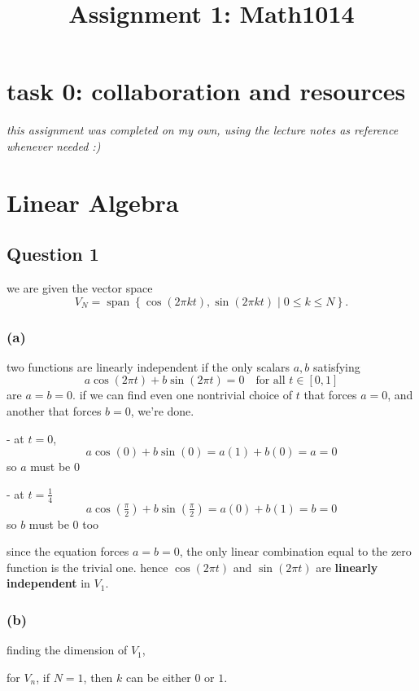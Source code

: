 \documentclass{article}
\author{}
\title{Assignment 1: Math1014}
\begin{document}
\setlength{\parindent}{0pt}
\maketitle

\section*{task 0: collaboration and resources}

\textit{this assignment was completed on my own, using the lecture notes as reference whenever needed :)}

\section{Linear Algebra}

\subsection{Question 1}
we are given the vector space
\[
V_N = \operatorname{span} \left\{\cos(2\pi kt),\sin(2\pi kt)\mid 0\leq k\leq N\right\}.
\]

\subsubsection*{(a)}
two functions are linearly independent if the only scalars $a,b$ satisfying
\[
a\cos(2\pi t) + b \sin(2\pi t) = 0 \quad \text{for all } t \in [0,1]
\]
are $a = b = 0$. if we can find even one nontrivial choice of $t$ that forces $a=0$, and another that forces $b=0$, we're done.

- at $t=0$,
\[
a\cos(0) + b\sin(0) = a(1) + b(0) = a = 0
\]
so $a$ must be $0$
 
- at $t = \frac{1}{4}$
\[
a\cos\left(\tfrac{\pi}{2}\right) + b\sin\left(\tfrac{\pi}{2}\right) = a(0) + b(1) = b = 0
\]
so $b$ must be $0$ too
 
since the equation forces $a=b=0$, the only linear combination equal to the zero function is the trivial one. 
hence $\cos(2\pi t)$ and $\sin(2\pi t)$ are \textbf{linearly independent} in $V_1$.

\subsubsection*{(b)}
finding the dimension of $V_1$,

for $V_n$, if $N=1$, then $k$ can be either $0$ or $1$.
\end{document}
